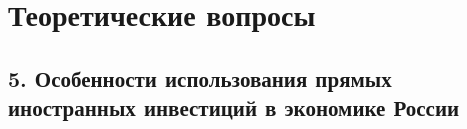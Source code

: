 \section{Теоретические вопросы}
\subsection*{5. Особенности использования прямых иностранных инвестиций в экономике России}
